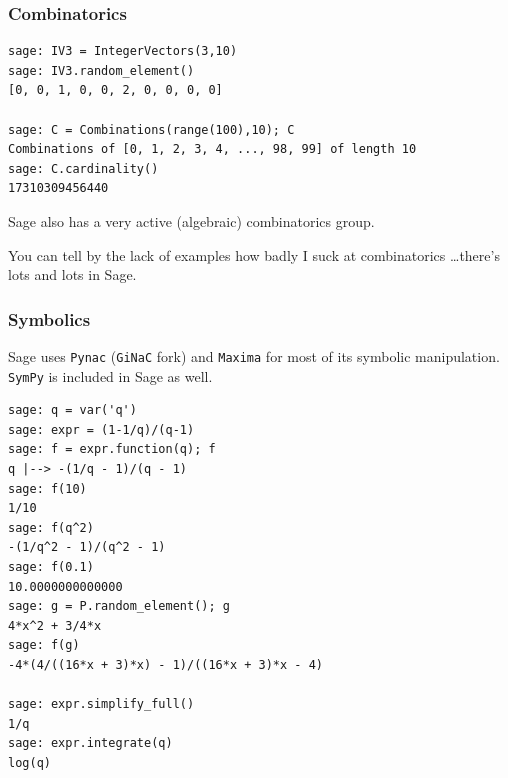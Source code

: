 \documentclass[10pt]{beamer}
\begin{document}
\begin{frame}[fragile]
\frametitle{Combinatorics}
\begin{lstlisting}
sage: IV3 = IntegerVectors(3,10)
sage: IV3.random_element()
[0, 0, 1, 0, 0, 2, 0, 0, 0, 0]

sage: C = Combinations(range(100),10); C
Combinations of [0, 1, 2, 3, 4, ..., 98, 99] of length 10
sage: C.cardinality()
17310309456440
\end{lstlisting}

Sage also has a very active (algebraic) combinatorics group.

\begin{block}{}
You can tell by the lack of examples how badly I suck at combinatorics \dots there's lots and lots in Sage.
\end{block}


\end{frame}

\begin{frame}[fragile]
\frametitle{Symbolics}
Sage uses {\tt Pynac} ({\tt GiNaC} fork) and {\tt Maxima} for most of its symbolic manipulation. {\tt SymPy} is included in Sage as well.

\begin{lstlisting}
sage: q = var('q')
sage: expr = (1-1/q)/(q-1)
sage: f = expr.function(q); f
q |--> -(1/q - 1)/(q - 1)
sage: f(10)
1/10
sage: f(q^2)
-(1/q^2 - 1)/(q^2 - 1)
sage: f(0.1)
10.0000000000000
sage: g = P.random_element(); g
4*x^2 + 3/4*x
sage: f(g)
-4*(4/((16*x + 3)*x) - 1)/((16*x + 3)*x - 4)

sage: expr.simplify_full()
1/q
sage: expr.integrate(q)
log(q)
\end{lstlisting}
\end{frame}
\end{document}
